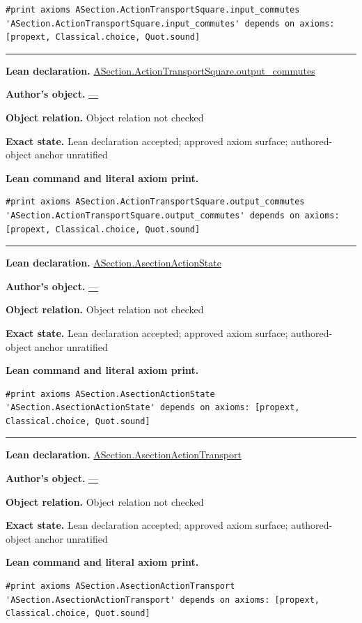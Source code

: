 \documentclass[11pt]{article}
\theoremstyle{plain}
\theoremstyle{definition}
\theoremstyle{remark}
\begin{document}
\begin{tcolorbox}
\begin{Verbatim}[breaklines=true,breakanywhere=true,fontsize=\small]
#print axioms ASection.ActionTransportSquare.input_commutes
'ASection.ActionTransportSquare.input_commutes' depends on axioms: [propext, Classical.choice, Quot.sound]
\end{Verbatim}
\medskip\hrule\medskip
\textbf{Lean declaration.} \url{ASection.ActionTransportSquare.output_commutes}
\par\textbf{Author's object.} \url{—}
\par\textbf{Object relation.} Object relation not checked
\par\textbf{Exact state.} Lean declaration accepted; approved axiom surface; authored-object anchor unratified
\par\smallskip\textbf{Lean command and literal axiom print.}
\begin{Verbatim}[breaklines=true,breakanywhere=true,fontsize=\small]
#print axioms ASection.ActionTransportSquare.output_commutes
'ASection.ActionTransportSquare.output_commutes' depends on axioms: [propext, Classical.choice, Quot.sound]
\end{Verbatim}
\medskip\hrule\medskip
\textbf{Lean declaration.} \url{ASection.AsectionActionState}
\par\textbf{Author's object.} \url{—}
\par\textbf{Object relation.} Object relation not checked
\par\textbf{Exact state.} Lean declaration accepted; approved axiom surface; authored-object anchor unratified
\par\smallskip\textbf{Lean command and literal axiom print.}
\begin{Verbatim}[breaklines=true,breakanywhere=true,fontsize=\small]
#print axioms ASection.AsectionActionState
'ASection.AsectionActionState' depends on axioms: [propext, Classical.choice, Quot.sound]
\end{Verbatim}
\medskip\hrule\medskip
\textbf{Lean declaration.} \url{ASection.AsectionActionTransport}
\par\textbf{Author's object.} \url{—}
\par\textbf{Object relation.} Object relation not checked
\par\textbf{Exact state.} Lean declaration accepted; approved axiom surface; authored-object anchor unratified
\par\smallskip\textbf{Lean command and literal axiom print.}
\begin{Verbatim}[breaklines=true,breakanywhere=true,fontsize=\small]
#print axioms ASection.AsectionActionTransport
'ASection.AsectionActionTransport' depends on axioms: [propext, Classical.choice, Quot.sound]

\end{Verbatim}
\end{tcolorbox}
\end{document}
